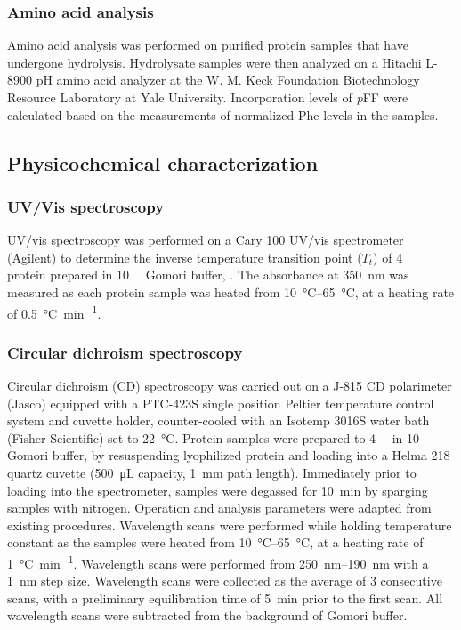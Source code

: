 \begin{refsection}
\subsubsection{Amino acid analysis}

Amino acid analysis was performed on purified protein samples that have
undergone hydrolysis. Hydrolysate samples were then analyzed on a Hitachi L-8900
pH amino acid analyzer at the W. M. Keck Foundation Biotechnology Resource
Laboratory at Yale University. Incorporation levels of \emph{p}FF were calculated based
on the measurements of normalized Phe levels in the samples.

\subsection{Physicochemical characterization}

\subsubsection{UV/Vis spectroscopy}

UV/vis spectroscopy was performed on a Cary 100 UV/vis spectrometer (Agilent) to
determine the inverse temperature transition point ({$T_t$}) of 
\SI{4}{\micro\moLar} protein prepared in \SI{10}{\milli\moLar} Gomori buffer,
. The absorbance at \SI{350}{\nm} was measured as each protein sample was
heated from \SIrange{10}{65}{\celsius}, at a heating rate of
\SI{0.5}{\celsius\per\minute}.\cite{Chilkoti2002a}

\subsubsection{Circular dichroism spectroscopy}

Circular dichroism (CD) spectroscopy was carried out on a J-815 CD polarimeter
(Jasco) equipped with a PTC-423S single position Peltier temperature control
system and cuvette holder, counter-cooled with an Isotemp 3016S water bath
(Fisher Scientific) set to \SI{22}{\celsius}. Protein samples were prepared to
\SI{4}{\micro\moLar} in \SI{10}{\milli\moLar} Gomori buffer, by resuspending
lyophilized protein and loading into a Helma 218 quartz cuvette (\SI{500}{\uL}
capacity, \SI{1}{mm} path length). Immediately prior to loading into the
spectrometer, samples were degassed for \SI{10}{\minute} by sparging samples
with nitrogen. Operation and analysis parameters were adapted from existing
procedures.\cite{Haghpanah2009} Wavelength scans were performed while holding
temperature constant as the samples were heated from \SIrange{10}{65}{\celsius},
at a heating rate of \SI{1}{\celsius\per\minute}.  Wavelength scans were
performed from \SIrange{250}{190}{\nm} with a \SI{1}{\nm} step size. Wavelength
scans were collected as the average of 3 consecutive scans, with a preliminary
equilibration time of \SI{5}{\minute} prior to the first scan. All wavelength
scans were subtracted from the background of Gomori buffer.


\end{refsection}
